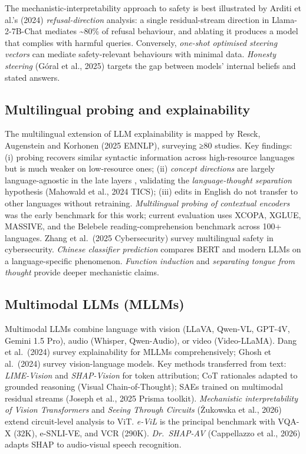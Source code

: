 \documentclass{article}
\begin{document}
The mechanistic-interpretability approach to safety is best illustrated by Arditi et al.'s (2024) \emph{refusal-direction} analysis: a single residual-stream direction in Llama-2-7B-Chat mediates \textasciitilde80\% of refusal behaviour, and ablating it produces a model that complies with harmful queries. Conversely, \emph{one-shot optimised steering vectors} \citep{dunefsky2025oneshotoptimizedst} can mediate safety-relevant behaviours with minimal data. \emph{Honesty steering} (Góral et al., 2025) targets the gap between models' internal beliefs and stated answers.

\subsection{Multilingual probing and explainability}\label{multilingual-probing-and-explainability}

The multilingual extension of LLM explainability is mapped by Resck, Augenstein and Korhonen (2025 EMNLP), surveying ≥80 studies. Key findings: (i) probing recovers similar syntactic information across high-resource languages but is much weaker on low-resource ones; (ii) \emph{concept directions} are largely language-agnostic in the late layers \citep{dumas2024separatingtonguefr}, validating the \emph{language-thought separation} hypothesis (Mahowald et al., 2024 TICS); (iii) edits in English do not transfer to other languages without retraining. \emph{Multilingual probing of contextual encoders} \citep{ravishankar2019multilingualprobin} was the early benchmark for this work; current evaluation uses XCOPA, XGLUE, MASSIVE, and the Belebele reading-comprehension benchmark across 100+ languages. Zhang et al.~(2025 Cybersecurity) survey multilingual safety in cybersecurity. \emph{Chinese classifier prediction} \citep{zhang2025jailbreakdistillat} compares BERT and modern LLMs on a language-specific phenomenon. \emph{Function induction} \citep{ye2025functioninductiona} and \emph{separating tongue from thought} \citep{dumas2024separatingtonguefr} provide deeper mechanistic claims.

\subsection{Multimodal LLMs (MLLMs)}\label{multimodal-llms-mllms}

Multimodal LLMs combine language with vision (LLaVA, Qwen-VL, GPT-4V, Gemini 1.5 Pro), audio (Whisper, Qwen-Audio), or video (Video-LLaMA). Dang et al.~(2024) survey explainability for MLLMs comprehensively; Ghosh et al.~(2024) survey vision-language models. Key methods transferred from text: \emph{LIME-Vision} and \emph{SHAP-Vision} for token attribution; CoT rationales adapted to grounded reasoning (Visual Chain-of-Thought); SAEs trained on multimodal residual streams (Joseph et al., 2025 Prisma toolkit). \emph{Mechanistic interpretability of Vision Transformers} \citep{bahador2025mechanisticinterpr} and \emph{Seeing Through Circuits} (Żukowska et al., 2026) extend circuit-level analysis to ViT. \emph{e-ViL} \citep{kayser2021eviladatasetandben} is the principal benchmark with VQA-X (32K), e-SNLI-VE, and VCR (290K). \emph{Dr.~SHAP-AV} (Cappellazzo et al., 2026) adapts SHAP to audio-visual speech recognition.
\end{document}
